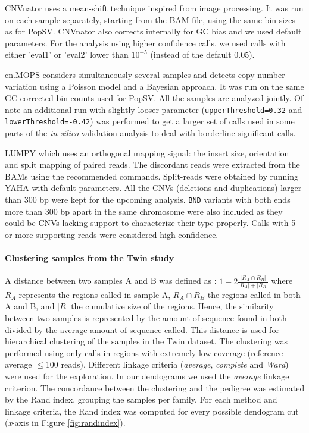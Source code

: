 {\sf CNVnator}\cite{Abyzov2011} uses a mean-shift technique inspired from image processing.
It was run on each sample separately, starting from the BAM file, using the same bin sizes as for {\sf PopSV}.
{\sf CNVnator} also corrects internally for GC bias and we used default parameters.
For the analysis using higher confidence calls, we used calls with either 'eval1' or 'eval2' lower than $10^{-5}$ (instead of the default 0.05).

{\sf cn.MOPS}\cite{Klambauer2012} considers simultaneously several samples and detects copy number variation using a Poisson model and a Bayesian approach.
It was run on the same GC-corrected bin counts used for {\sf PopSV}.
All the samples are analyzed jointly.
Of note an additional run with slightly looser parameter (\verb!upperThreshold=0.32! and \verb!lowerThreshold=-0.42!) was performed to get a larger set of calls used in some parts of the {\it in silico} validation analysis to deal with borderline significant calls.

{\sf LUMPY}\cite{Layer2012} which uses an orthogonal mapping signal: the insert size, orientation and split mapping of paired reads.
The discordant reads were extracted from the BAMs using the recommended commands.
Split-reads were obtained by running {\sf YAHA}\cite{Faust2012} with default parameters.
All the CNVs (deletions and duplications) larger than 300 bp were kept for the upcoming analysis.
\verb!BND! variants with both ends more than 300 bp apart in the same chromosome were also included as they could be CNVs lacking support to characterize their type properly.
Calls with 5 or more supporting reads were considered high-confidence.

\paragraph{Clustering samples from the Twin study}
A distance between two samples A and B was defined as : $1 - 2\frac{|R_A \cap R_B|}{|R_A| + |R_B|}$ where $R_A$ represents the regions called in sample A, $R_A \cap R_B$ the regions called in both A and B, and $|R|$ the cumulative size of the regions.
Hence, the similarity between two samples is represented by the amount of sequence found in both divided by the average amount of sequence called.
This distance is used for hierarchical clustering of the samples in the Twin dataset.
The clustering was performed using only calls in regions with extremely low coverage (reference average $\le$100 reads).
Different linkage criteria ({\it average}, {\it complete} and {\it Ward}) were used for the exploration.
In our dendograms we used the {\it average} linkage criterion.
The concordance between the clustering and the pedigree was estimated by the Rand index, grouping the samples per family.
For each method and linkage criteria, the Rand index was computed for every possible dendogram cut ({\it x}-axis in Figure \ref{fig:randindex}).

